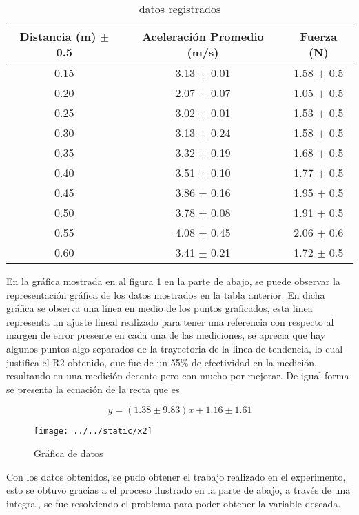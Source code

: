 \documentclass{article}
\begin{document}
\begin{table}[H]
	\centering
	\begin{tabular}{|c|c|c|}
\hline
Distancia (m) $\pm$ 0.5 &Aceleración Promedio (m/s) &Fuerza (N) \\
\hline
0.15 &3.13 $\pm$ 0.01 &1.58 $\pm$ 0.5 \\
\hline
0.20 &2.07 $\pm$ 0.07 &1.05 $\pm$ 0.5 \\
\hline
0.25 &3.02 $\pm$ 0.01 &1.53 $\pm$ 0.5 \\
\hline
0.30 &3.13 $\pm$ 0.24 &1.58 $\pm$ 0.5 \\
\hline
0.35 &3.32 $\pm$ 0.19 &1.68 $\pm$ 0.5 \\
\hline
0.40 &3.51 $\pm$ 0.10 &1.77 $\pm$ 0.5 \\
\hline
0.45 &3.86 $\pm$ 0.16 &1.95 $\pm$ 0.5 \\
\hline
0.50 &3.78 $\pm$ 0.08 &1.91 $\pm$ 0.5 \\
\hline
0.55 &4.08 $\pm$ 0.45 &2.06 $\pm$ 0.6 \\
\hline
0.60 &3.41 $\pm$ 0.21 &1.72 $\pm$ 0.5 \\
\hline
\end{tabular}
\caption{datos registrados}
\label{tab:1}
\end{table}

En la gráfica mostrada en al figura \ref{fig:2} en la parte de abajo, se puede observar la representación gráfica de los datos mostrados en la tabla anterior. En dicha gráfica se observa una línea en medio de los puntos graficados, esta linea representa un ajuste lineal realizado para tener una referencia con respecto al margen de error presente en cada una de las mediciones, se aprecia que hay algunos puntos algo separados de la trayectoria de la linea de tendencia, lo cual justifica el R2 obtenido, que fue de un 55$\%$ de efectividad en la medición, resultando en una medición decente pero con mucho por mejorar. De igual forma se presenta la ecuación de la recta que es

\begin{equation*}
	y = (1.38 \pm 9.83)x + 1.16 \pm 1.61
\end{equation*}	

\begin{figure}[H]
	\centering	
	\texttt{[image: ../../static/x2]}
	\caption{Gráfica de datos }
	\label{fig:2}
\end{figure}


Con los datos obtenidos, se pudo obtener el trabajo realizado en el experimento, esto se obtuvo gracias a el proceso ilustrado en la parte de abajo, a través de una integral, se fue resolviendo el problema para poder obtener la variable deseada.
\end{document}
